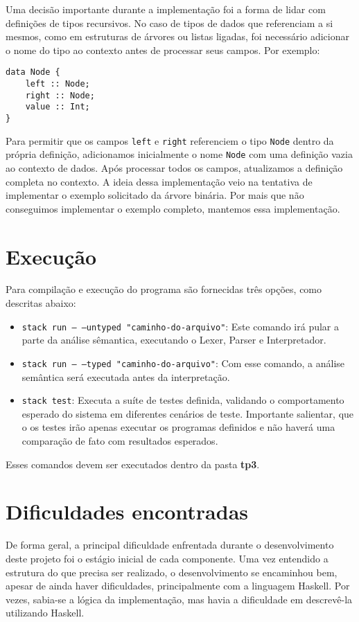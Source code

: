 \documentclass{article}
\begin{document}
Uma decisão importante durante a implementação foi a forma de lidar com definições de tipos recursivos. No caso de tipos de dados que referenciam a si mesmos, como em estruturas de árvores ou listas ligadas, foi necessário adicionar o nome do tipo ao contexto antes de processar seus campos. Por exemplo:

\begin{verbatim}
data Node {
    left :: Node;
    right :: Node;
    value :: Int;
}
\end{verbatim}

Para permitir que os campos \texttt{left} e \texttt{right} referenciem o tipo \texttt{Node} dentro da própria definição, adicionamos inicialmente o nome \texttt{Node} com uma definição vazia ao contexto de dados. Após processar todos os campos, atualizamos a definição completa no contexto. A ideia dessa implementação veio na tentativa de implementar o exemplo solicitado da árvore binária. Por mais que não conseguimos implementar o exemplo completo, mantemos essa implementação.

\section{Execução}
Para compilação e execução do programa são fornecidas três opções, como descritas abaixo:

\begin{itemize}
    \item \texttt{stack run -- --untyped "caminho-do-arquivo"}: Este comando irá pular a parte da análise sêmantica, executando o Lexer, Parser e Interpretador.
    \item \texttt{stack run -- --typed "caminho-do-arquivo"}: Com esse comando, a análise semântica será executada antes da interpretação.
    \item \texttt{stack test}: Executa a suíte de testes definida, validando o comportamento esperado do sistema em diferentes cenários de teste. Importante salientar, que o os testes irão apenas executar os programas definidos e não haverá uma comparação de fato com resultados esperados.
\end{itemize}

Esses comandos devem ser executados dentro da pasta \textbf{tp3}.

\section{Dificuldades encontradas}
De forma geral, a principal dificuldade enfrentada durante o desenvolvimento deste projeto foi o estágio inicial de cada componente. Uma vez entendido a estrutura do que precisa ser realizado, o desenvolvimento se encaminhou bem, apesar de ainda haver dificuldades, principalmente com a linguagem Haskell. Por vezes, sabia-se a lógica da implementação, mas havia a dificuldade em descrevê-la utilizando Haskell.
\end{document}
